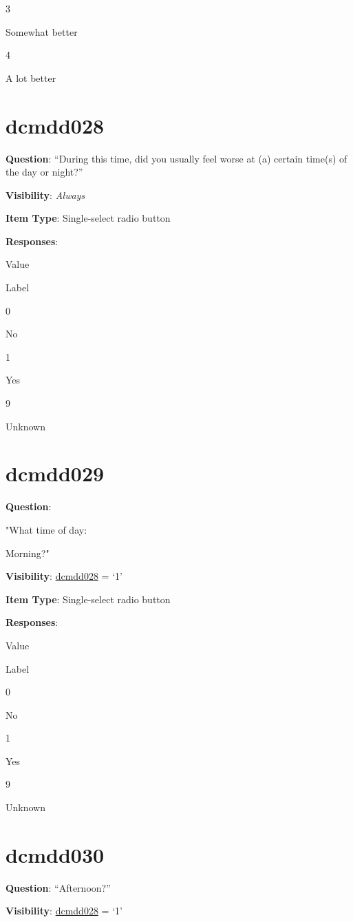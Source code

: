 \documentclass[]{book}
\begin{document}
3

Somewhat better

4

A lot better

\hypertarget{dcmdd028}{%
\section{dcmdd028}\label{dcmdd028}}

\textbf{Question}: ``During this time, did you usually feel worse at (a) certain time(s) of the day or night?''

\textbf{Visibility}: \emph{Always}

\textbf{Item Type}: Single-select radio button

\textbf{Responses}:

Value

Label

0

No

1

Yes

9

Unknown

\hypertarget{dcmdd029}{%
\section{dcmdd029}\label{dcmdd029}}

\textbf{Question}:

"What time of day:

Morning?"

\textbf{Visibility}: \protect\hyperlink{dcmdd028}{dcmdd028} = `1'

\textbf{Item Type}: Single-select radio button

\textbf{Responses}:

Value

Label

0

No

1

Yes

9

Unknown

\hypertarget{dcmdd030}{%
\section{dcmdd030}\label{dcmdd030}}

\textbf{Question}: ``Afternoon?''

\textbf{Visibility}: \protect\hyperlink{dcmdd028}{dcmdd028} = `1'
\end{document}
